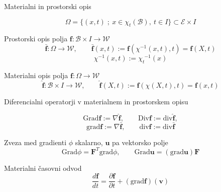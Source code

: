 \documentclass{beamer}
\newcommand{\E}{\mathscr E} %
\newcommand{\W}{\mathscr W} %
\newcommand{\B}{\mathcal B} %
\newcommand{\vek}[1]{\boldsymbol #1} %
\newcommand{\ten}[1]{\mathbf #1} %
\newcommand{\grad}{\mathrm{grad}} %
\renewcommand{\div}{\mathrm{div}} %
\newcommand{\Grad}{\mathrm{Grad}} %
\newcommand{\Div}{\mathrm {Div}} %
\newcommand{\bottop}[3]{{#1}_{#2}^{\phantom{#2}{#3}}}
\begin{document}
\begin{frame}{Materialni in prostorski opis}

\[ \Omega=\{(x,t)\;;\ x\in\chi_t(\B),\ t\in I\}\subset\E\times I \]

\begin{block}{Prostorski opis polja $\vek{f}\colon \B\times I\to\W$}
	\[
		\bar{\vek{f}}\colon\Omega\to\W,\qquad
		\bar{\vek{f}}(x,t):=\vek{f}(\chi^{-1}(x,t),t)=\vek{f}(X,t)
	\]
	\tiny{\[ \chi^{-1}(x,t):=\bottop{\chi}{t}{-1}(x) \]}
\end{block}

\begin{block}{Materialni opis polja $\vek{f}\colon\Omega\to\W$}
	\begin{equation*}
		\hat{\vek{f}}\colon \B\times I\to\W,\qquad
		\hat{\vek{f}}(X,t):=\vek{f}(\chi(X,t),t)=\vek{f}(x,t)
	\end{equation*}
\end{block}

\end{frame}


\begin{frame}{Diferencialni operatorji v materialnem in prostorskem opisu}

\[ \Grad\vek{f}:=\nabla\hat{\vek{f}},\qquad \Div\vek{f}:=\div\hat{\vek{f}}, \]
\[ \grad\vek{f}:=\nabla\bar{\vek{f}},\qquad \div\vek{f}:=\div\bar{\vek{f}} \]

\begin{block}{Zveza med gradienti}
	$\phi$ skalarno, $\vek{u}$ pa vektorsko polje
	\begin{equation*}
		\Grad\phi=\ten{F}^{T}\grad\phi,\qquad \Grad\vek{u}=(\grad\vek{u})\ten{F}
	\end{equation*}
\end{block}

\begin{block}{Materialni časovni odvod}
	\begin{equation*}
		\frac{d\vek{f}}{dt}=\frac{\partial\vek{f}}{\partial t}+(\grad\vek{f})(\vek{v})
	\end{equation*}
\end{block}

\end{frame}
\end{document}
